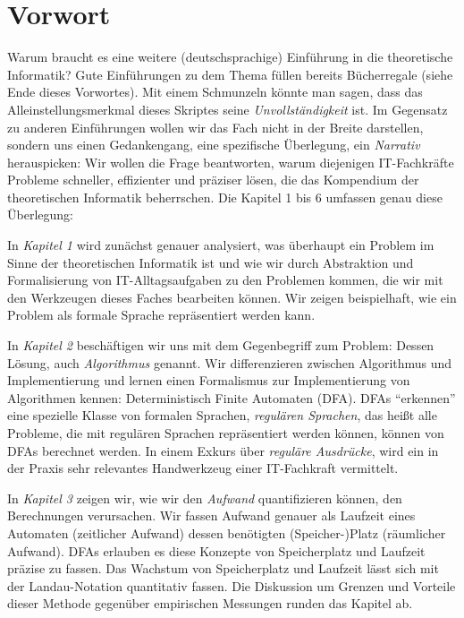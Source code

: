 \chapter{Vorwort}

Warum braucht es eine weitere (deutschsprachige) Einführung
in die theoretische Informatik?
Gute Einführungen zu dem Thema füllen bereits Bücherregale
(siehe Ende dieses Vorwortes).
Mit einem Schmunzeln könnte man sagen,
dass das Alleinstellungsmerkmal dieses Skriptes seine
\emph{Unvollständigkeit} ist.
Im Gegensatz zu anderen Einführungen wollen wir das Fach nicht in der Breite darstellen,
sondern uns einen Gedankengang, eine spezifische Überlegung,
ein \emph{Narrativ} herauspicken:
Wir wollen die Frage beantworten,
warum diejenigen IT-Fachkräfte Probleme
schneller, effizienter und präziser lösen,
die das Kompendium der theoretischen Informatik beherrschen.
Die Kapitel 1 bis 6 umfassen genau diese Überlegung:

In \emph{Kapitel 1} wird zunächst genauer analysiert,
was überhaupt ein Problem im Sinne der theoretischen Informatik ist
und wie wir durch Abstraktion und Formalisierung von IT-Alltagsaufgaben
zu den Problemen kommen, die wir mit den Werkzeugen dieses Faches bearbeiten können.
Wir zeigen beispielhaft,
wie ein Problem als formale Sprache repräsentiert werden kann.

In \emph{Kapitel 2} beschäftigen wir uns mit dem Gegenbegriff zum Problem:
Dessen Lösung, auch \emph{Algorithmus} genannt.
Wir differenzieren zwischen Algorithmus und Implementierung
und lernen einen Formalismus zur Implementierung von Algorithmen kennen:
Deterministisch Finite Automaten (DFA).
DFAs ``erkennen'' eine spezielle Klasse von formalen Sprachen,
\emph{regulären Sprachen},
das heißt alle Probleme, die mit regulären Sprachen repräsentiert werden können,
können von DFAs berechnet werden.
In einem Exkurs über \emph{reguläre Ausdrücke},
wird ein in der Praxis sehr relevantes Handwerkzeug einer IT-Fachkraft vermittelt.

In \emph{Kapitel 3} zeigen wir, 
wie wir den \emph{Aufwand} quantifizieren können,
den Berechnungen verursachen. 
Wir fassen Aufwand genauer als Laufzeit eines Automaten (zeitlicher Aufwand) 
dessen benötigten (Speicher-)Platz (räumlicher Aufwand).
DFAs erlauben es diese Konzepte von Speicherplatz und Laufzeit präzise zu fassen.
Das Wachstum von Speicherplatz und Laufzeit lässt sich
mit der Landau-Notation quantitativ fassen.
Die Diskussion um Grenzen und Vorteile dieser Methode
gegenüber empirischen Messungen runden das Kapitel ab.


